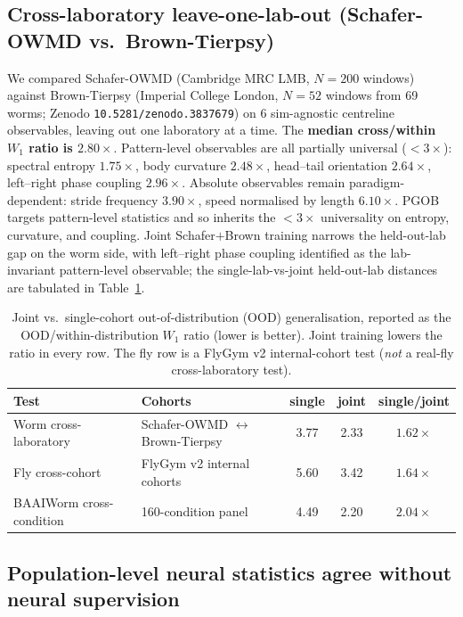 \documentclass[11pt]{article}
\begin{document}
\subsection{Cross-laboratory leave-one-lab-out (Schafer-OWMD vs.\ Brown-Tierpsy)}
\label{sec:crosslab}

We compared Schafer-OWMD (Cambridge MRC LMB, $N{=}200$ windows) against Brown-Tierpsy (Imperial College London, $N{=}52$ windows from 69 worms; Zenodo \texttt{10.5281/zenodo.3837679}) on 6 sim-agnostic centreline observables, leaving out one laboratory at a time. The \textbf{median cross/within $W_1$ ratio is $2.80\times$}. Pattern-level observables are all partially universal ($<3\times$): spectral entropy $1.75\times$, body curvature $2.48\times$, head--tail orientation $2.64\times$, left--right phase coupling $2.96\times$. Absolute observables remain paradigm-dependent: stride frequency $3.90\times$, speed normalised by length $6.10\times$. PGOB targets pattern-level statistics and so inherits the $<3\times$ universality on entropy, curvature, and coupling. Joint Schafer$+$Brown training narrows the held-out-lab gap on the worm side, with left--right phase coupling identified as the lab-invariant pattern-level observable; the single-lab-vs-joint held-out-lab distances are tabulated in Table~\ref{tab:joint_ood}.

\begin{table}[H]
\centering\small
\caption{Joint vs.\ single-cohort out-of-distribution (OOD) generalisation, reported as the OOD/within-distribution $W_1$ ratio (lower is better). Joint training lowers the ratio in every row. The fly row is a FlyGym v2 internal-cohort test (\emph{not} a real-fly cross-laboratory test).}
\label{tab:joint_ood}
\begin{tabular}{llccc}\toprule
Test & Cohorts & single & joint & single/joint \\\midrule
Worm cross-laboratory & Schafer-OWMD $\leftrightarrow$ Brown-Tierpsy & 3.77 & 2.33 & $1.62\times$ \\
Fly cross-cohort & FlyGym v2 internal cohorts & 5.60 & 3.42 & $1.64\times$ \\
BAAIWorm cross-condition & 160-condition panel & 4.49 & 2.20 & $2.04\times$ \\\bottomrule
\end{tabular}
\end{table}

\subsection{Population-level neural statistics agree without neural supervision}
\label{sec:neural_unpaired}
\end{document}
